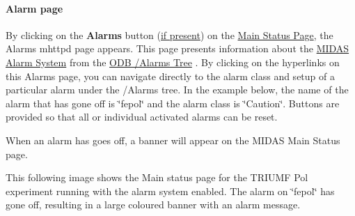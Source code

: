 \par




\par
 \label{index_end}
\hypertarget{index_end}{}
 \paragraph{Alarm page}\label{RC_mhttpd_Alarm_page}
\par
 \label{RC_mhttpd_Alarm_page_idx_mhttpd_page_alarm}
\hypertarget{RC_mhttpd_Alarm_page_idx_mhttpd_page_alarm}{}




\par


By clicking on the {\bfseries Alarms} button (\hyperlink{RC_mhttpd_status_page_features_RC_mhttpd_status_menu_buttons}{if present}) on the \hyperlink{RC_mhttpd_Main_Status_page}{Main Status Page}, the Alarms mhttpd page appears. This page presents information about the \hyperlink{RC_customize_ODB_RC_Alarm_System}{MIDAS Alarm System} from the \hyperlink{RC_customize_ODB_RC_ODB_Alarms_Tree}{ODB /Alarms Tree} . By clicking on the hyperlinks on this Alarms page, you can navigate directly to the alarm class and setup of a particular alarm under the /Alarms tree. In the example below, the name of the alarm that has gone off is \char`\"{}fepol\char`\"{} and the alarm class is \char`\"{}Caution\char`\"{}. Buttons are provided so that all or individual activated alarms can be reset.

\par
\par
\par
 \begin{center}  \par
\par
\par
  \end{center}  \par
\par
\par


\label{RC_mhttpd_Alarm_page_RC_mhttpd_alarm_banner}
\hypertarget{RC_mhttpd_Alarm_page_RC_mhttpd_alarm_banner}{}
 When an alarm has goes off, a banner will appear on the MIDAS Main Status page.

This following image shows the Main status page for the TRIUMF Pol experiment running with the alarm system enabled. The alarm on \char`\"{}fepol\char`\"{} has gone off, resulting in a large coloured banner with an alarm message.

